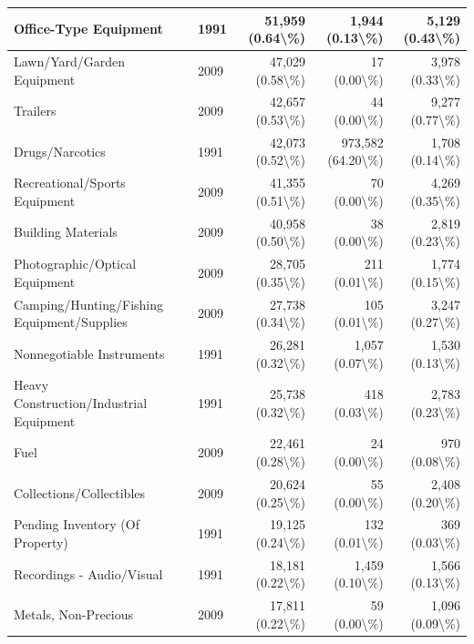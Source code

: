 \documentclass[
]{krantz}
\begin{document}
\begin{longtable}[t]{l|l|r|r|r}
\hline
Office-Type Equipment & 1991 & 51,959 (0.64\textbackslash{}\%) & 1,944 (0.13\textbackslash{}\%) & 5,129 (0.43\textbackslash{}\%)\\
\hline
Lawn/Yard/Garden Equipment & 2009 & 47,029 (0.58\textbackslash{}\%) & 17 (0.00\textbackslash{}\%) & 3,978 (0.33\textbackslash{}\%)\\
\hline
Trailers & 2009 & 42,657 (0.53\textbackslash{}\%) & 44 (0.00\textbackslash{}\%) & 9,277 (0.77\textbackslash{}\%)\\
\hline
Drugs/Narcotics & 1991 & 42,073 (0.52\textbackslash{}\%) & 973,582 (64.20\textbackslash{}\%) & 1,708 (0.14\textbackslash{}\%)\\
\hline
Recreational/Sports Equipment & 2009 & 41,355 (0.51\textbackslash{}\%) & 70 (0.00\textbackslash{}\%) & 4,269 (0.35\textbackslash{}\%)\\
\hline
Building Materials & 2009 & 40,958 (0.50\textbackslash{}\%) & 38 (0.00\textbackslash{}\%) & 2,819 (0.23\textbackslash{}\%)\\
\hline
Photographic/Optical Equipment & 2009 & 28,705 (0.35\textbackslash{}\%) & 211 (0.01\textbackslash{}\%) & 1,774 (0.15\textbackslash{}\%)\\
\hline
Camping/Hunting/Fishing Equipment/Supplies & 2009 & 27,738 (0.34\textbackslash{}\%) & 105 (0.01\textbackslash{}\%) & 3,247 (0.27\textbackslash{}\%)\\
\hline
Nonnegotiable Instruments & 1991 & 26,281 (0.32\textbackslash{}\%) & 1,057 (0.07\textbackslash{}\%) & 1,530 (0.13\textbackslash{}\%)\\
\hline
Heavy Construction/Industrial Equipment & 1991 & 25,738 (0.32\textbackslash{}\%) & 418 (0.03\textbackslash{}\%) & 2,783 (0.23\textbackslash{}\%)\\
\hline
Fuel & 2009 & 22,461 (0.28\textbackslash{}\%) & 24 (0.00\textbackslash{}\%) & 970 (0.08\textbackslash{}\%)\\
\hline
Collections/Collectibles & 2009 & 20,624 (0.25\textbackslash{}\%) & 55 (0.00\textbackslash{}\%) & 2,408 (0.20\textbackslash{}\%)\\
\hline
Pending Inventory (Of Property) & 1991 & 19,125 (0.24\textbackslash{}\%) & 132 (0.01\textbackslash{}\%) & 369 (0.03\textbackslash{}\%)\\
\hline
Recordings - Audio/Visual & 1991 & 18,181 (0.22\textbackslash{}\%) & 1,459 (0.10\textbackslash{}\%) & 1,566 (0.13\textbackslash{}\%)\\
\hline
Metals, Non-Precious & 2009 & 17,811 (0.22\textbackslash{}\%) & 59 (0.00\textbackslash{}\%) & 1,096 (0.09\textbackslash{}\%)\\

\end{longtable}
\end{document}
